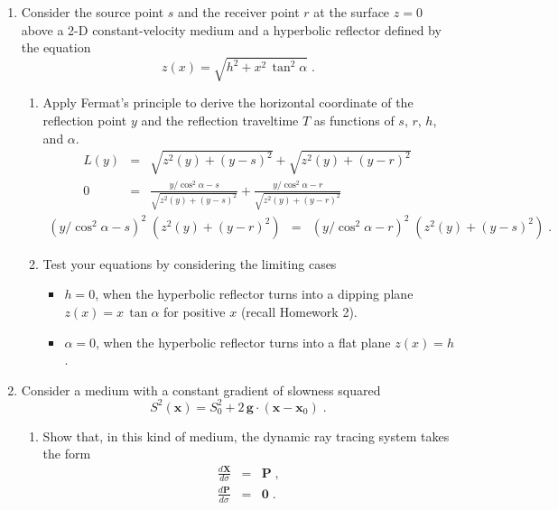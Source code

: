 \begin{enumerate}
\item Consider the source point $s$ and the receiver point $r$ at the
  surface $z=0$ above a 2-D constant-velocity medium and a hyperbolic
  reflector defined by the equation 
  \begin{equation}
    \label{eq:hyper}
    z(x) = \sqrt{h^2 +
      x^2\,\tan^2{\alpha}}\;.
  \end{equation}
  \begin{enumerate}
  \item Apply Fermat's principle to derive the horizontal coordinate of
    the reflection point $y$ and the reflection traveltime $T$ as 
    functions of $s$, $r$, $h$, and $\alpha$.
 \begin{eqnarray}
L(y) & = & \sqrt{z^2(y)+(y-s)^2} + \sqrt{z^2(y)+(y-r)^2}\; \\
0 & = & \frac{y/\cos^2\alpha-s}{\sqrt{z^2(y)+(y-s)^2}}
+ \frac{y/\cos^2\alpha-r}{\sqrt{z^2(y)+(y-r)^2}}\;
 \end{eqnarray}
 \begin{eqnarray}
 (y/\cos^2\alpha-s)^2\;(z^2(y)+(y-r)^2) & = & (y/\cos^2\alpha-r)^2\;(z^2(y)+(y-s)^2)\;. \nonumber
 \end{eqnarray}
  \item Test your equations by considering the limiting cases
    \begin{itemize}
    \item $h=0$, 
      when the hyperbolic reflector turns into a dipping 
      plane $z(x)= x\,\tan{\alpha}$ for positive $x$ (recall Homework 2).
    \item $\alpha=0$,
      when the
      hyperbolic reflector turns into a flat plane $z(x)=h$.
    \end{itemize}
  \end{enumerate}
\item Consider a medium with a constant gradient of slowness squared
  \begin{equation}
    S^2(\mathbf{x}) = S_0^2 + 2\,\mathbf{g} \cdot (\mathbf{x}-\mathbf{x}_0)\;.
  \end{equation}
  \begin{enumerate}
  \item Show that, in this kind of medium, the dynamic ray tracing system
    takes the form
  \begin{eqnarray}
    \label{eq:dxds}
    {\frac{d \mathbf{X}}{d \sigma}} & = & \mathbf{P}\;, \\
    {\frac{d \mathbf{P}}{d \sigma}} & = & \mathbf{0}\;.

\end{eqnarray}
\end{enumerate}
\end{enumerate}
